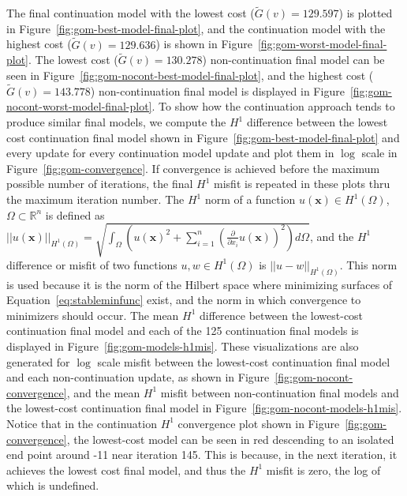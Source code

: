The final continuation model with the lowest cost ($\tilde{G}(v)=129.597$) is plotted in Figure~\ref{fig:gom-best-model-final-plot}, and the continuation model with the highest cost ($\tilde{G}(v)=129.636$) is shown in Figure~\ref{fig:gom-worst-model-final-plot}.  The lowest cost ($\tilde{G}(v)=130.278$) non-continuation final model can be seen in Figure~\ref{fig:gom-nocont-best-model-final-plot}, and the highest cost ($\tilde{G}(v)=143.778$) non-continuation final model is displayed in Figure~\ref{fig:gom-nocont-worst-model-final-plot}.  To show how the continuation approach tends to produce similar final models, we compute the $H^1$ difference between the lowest cost continuation final model shown in Figure~\ref{fig:gom-best-model-final-plot} and every update for every continuation model update and plot them in $\log$ scale in Figure~\ref{fig:gom-convergence}. If convergence is achieved before the maximum possible number of iterations, the final $H^1$ misfit is repeated in these plots thru the maximum iteration number.  The $H^1$ norm of a function $u(\mathbf{x}) \in H^1(\Omega)$, $\Omega \subset \mathbb{R}^n$ is defined as $\left|\left| u(\mathbf{x}) \right|\right|_{H^1(\Omega)} = \sqrt{\int_{\Omega}\left( u(\mathbf{x})^2 + \sum_{i=1}^{n}\left({\frac{\partial}{\partial x_i} u(\mathbf{x})}\right)^2 \right)d\Omega}$, and the $H^1$ difference or misfit of two functions $u,w \in H^1(\Omega)$ is $\left| \left| u-w \right|\right|_{H^1(\Omega)}$.   This norm is used because it is the norm of the Hilbert space where minimizing surfaces of Equation~\ref{eq:stableminfunc} exist, and the norm in which convergence to minimizers should occur.    The mean $H^1$ difference between the lowest-cost continuation final model and each of the 125 continuation final models is displayed in Figure~\ref{fig:gom-models-h1mis}.  These visualizations are also generated for $\log$ scale misfit between the lowest-cost continuation final model and each non-continuation update, as shown in Figure~\ref{fig:gom-nocont-convergence}, and the mean $H^1$ misfit between non-continuation final models and the lowest-cost continuation final model in Figure~\ref{fig:gom-nocont-models-h1mis}.   Notice that in the continuation $H^1$ convergence plot shown in Figure~\ref{fig:gom-convergence}, the lowest-cost model can be seen in red descending to an isolated end point around -11 near iteration 145.  This is because, in the next iteration, it achieves the lowest cost final model, and thus the $H^1$ misfit is zero, the log of which is undefined.

